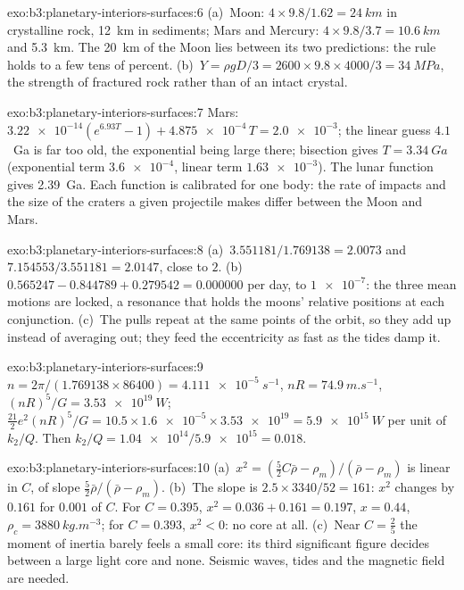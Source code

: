 \begin{solution}{exo:b3:planetary-interiors-surfaces:6}
(a)~Moon: $4\times9.8/1.62 = \qty{24}{km}$ in crystalline rock,
\qty{12}{km} in sediments; Mars and Mercury: $4\times9.8/3.7 =
\qty{10.6}{km}$ and \qty{5.3}{km}. The \qty{20}{km} of the Moon lies between
its two predictions: the rule holds to a few tens of percent. (b)~$Y =
\rho gD/3 = 2600\times9.8\times4000/3 = \qty{34}{MPa}$, the strength of
fractured rock rather than of an intact crystal.
\end{solution}

\begin{solution}{exo:b3:planetary-interiors-surfaces:7}
Mars: $\num{3.22e-14}(e^{6.93T} - 1) + \num{4.875e-4}\,T = \num{2.0e-3}$;
the linear guess $4.1$~Ga is far too old, the exponential being large
there; bisection gives $T = \qty{3.34}{Ga}$ (exponential term
$\num{3.6e-4}$, linear term $\num{1.63e-3}$). The lunar function gives
\qty{2.39}{Ga}. Each function is calibrated for one body: the rate of
impacts and the size of the craters a given projectile makes differ
between the Moon and Mars.
\end{solution}

\begin{solution}{exo:b3:planetary-interiors-surfaces:8}
(a)~$3.551181/1.769138 = 2.0073$ and $7.154553/3.551181 = 2.0147$, close to
$2$. (b)~$0.565247 - 0.844789 + 0.279542 = 0.000000$ per day, to
$\num{1e-7}$: the three mean motions are locked, a resonance that holds
the moons' relative positions at each conjunction. (c)~The pulls repeat at
the same points of the orbit, so they add up instead of averaging out;
they feed the eccentricity as fast as the tides damp it.
\end{solution}

\begin{solution}{exo:b3:planetary-interiors-surfaces:9}
$n = 2\pi/(1.769138\times86400) = \qty{4.111e-5}{s^{-1}}$, $nR =
\qty{74.9}{m.s^{-1}}$, $(nR)^5/G = \qty{3.53e19}{W}$;
$\tfrac{21}{2}e^2(nR)^5/G = 10.5\times\num{1.6e-5}\times\num{3.53e19} =
\qty{5.9e15}{W}$ per unit of $k_2/Q$. Then $k_2/Q =
\num{1.04e14}/\num{5.9e15} = 0.018$.
\end{solution}

\begin{solution}{exo:b3:planetary-interiors-surfaces:10}
(a)~$x^2 = (\tfrac52C\bar\rho - \rho_m)/(\bar\rho - \rho_m)$ is linear in
$C$, of slope $\tfrac52\bar\rho/(\bar\rho - \rho_m)$. (b)~The slope is
$2.5\times3340/52 = 161$: $x^2$ changes by $0.161$ for $0.001$ of $C$.
For $C = 0.395$, $x^2 = 0.036 + 0.161 = 0.197$, $x = 0.44$, $\rho_c =
\qty{3880}{kg.m^{-3}}$; for $C = 0.393$, $x^2 < 0$: no core at all.
(c)~Near $C = \tfrac25$ the moment of inertia barely feels a small core:
its third significant figure decides between a large light core and none.
Seismic waves, tides and the magnetic field are needed.
\end{solution}

